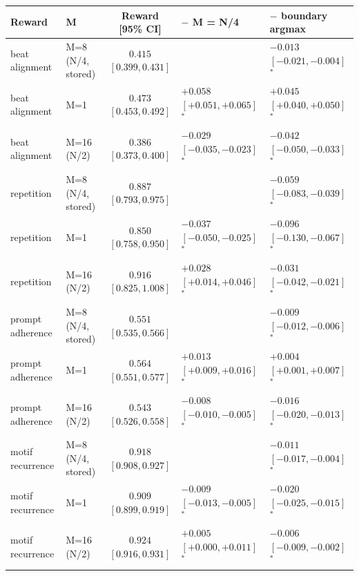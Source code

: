 \begin{tabular}{llcll}
\toprule
Reward & M & Reward [95\% CI] & $-$ M = N/4 & $-$ boundary argmax \\
\midrule
beat alignment & M=8 (N/4, stored) & $0.415$ $[0.399, 0.431]$ &  & $-0.013$ $[-0.021, -0.004]$$^*$ \\
beat alignment & M=1 & $0.473$ $[0.453, 0.492]$ & $+0.058$ $[+0.051, +0.065]$$^*$ & $+0.045$ $[+0.040, +0.050]$$^*$ \\
beat alignment & M=16 (N/2) & $0.386$ $[0.373, 0.400]$ & $-0.029$ $[-0.035, -0.023]$$^*$ & $-0.042$ $[-0.050, -0.033]$$^*$ \\
repetition & M=8 (N/4, stored) & $0.887$ $[0.793, 0.975]$ &  & $-0.059$ $[-0.083, -0.039]$$^*$ \\
repetition & M=1 & $0.850$ $[0.758, 0.950]$ & $-0.037$ $[-0.050, -0.025]$$^*$ & $-0.096$ $[-0.130, -0.067]$$^*$ \\
repetition & M=16 (N/2) & $0.916$ $[0.825, 1.008]$ & $+0.028$ $[+0.014, +0.046]$$^*$ & $-0.031$ $[-0.042, -0.021]$$^*$ \\
prompt adherence & M=8 (N/4, stored) & $0.551$ $[0.535, 0.566]$ &  & $-0.009$ $[-0.012, -0.006]$$^*$ \\
prompt adherence & M=1 & $0.564$ $[0.551, 0.577]$ & $+0.013$ $[+0.009, +0.016]$$^*$ & $+0.004$ $[+0.001, +0.007]$$^*$ \\
prompt adherence & M=16 (N/2) & $0.543$ $[0.526, 0.558]$ & $-0.008$ $[-0.010, -0.005]$$^*$ & $-0.016$ $[-0.020, -0.013]$$^*$ \\
motif recurrence & M=8 (N/4, stored) & $0.918$ $[0.908, 0.927]$ &  & $-0.011$ $[-0.017, -0.004]$$^*$ \\
motif recurrence & M=1 & $0.909$ $[0.899, 0.919]$ & $-0.009$ $[-0.013, -0.005]$$^*$ & $-0.020$ $[-0.025, -0.015]$$^*$ \\
motif recurrence & M=16 (N/2) & $0.924$ $[0.916, 0.931]$ & $+0.005$ $[+0.000, +0.011]$$^*$ & $-0.006$ $[-0.009, -0.002]$$^*$ \\
\bottomrule
\end{tabular}
